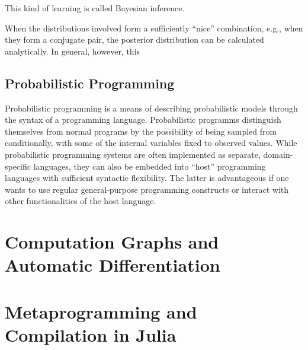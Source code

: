 This kind of learning is called Bayesian inference.

When the distributions involved form a sufficiently \enquote{nice} combination, e.g., when they form
a conjugate pair, the posterior distribution can be calculated analytically.  In general, however,
this


\subsection{Probabilistic Programming}
\label{sec:prob-prog}

Probabilistic programming is a means of describing probabilistic models through the syntax of a
programming language. Probabilistic programms distinguish themselves from normal programs by the
possibility of being sampled from conditionally, with some of the internal variables fixed to
observed values.  While probabilistic programming systems are often implemented as separate,
domain-specific languages, they can also be embedded into \enquote{host} programming languages with
sufficient syntactic flexibility.  The latter is advantageous if one wants to use regular
general-purpose programming constructs or interact with other functionalities of the host language.




\section{Computation Graphs and Automatic Differentiation}
\label{sec:graph-track-autom}


\section{Metaprogramming and Compilation in Julia}
\label{sec:metapr-comp-julia}




